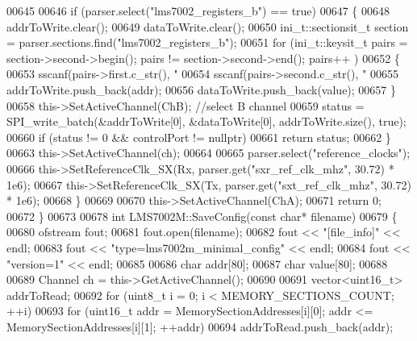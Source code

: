 \begin{DoxyCode}
{{{{{{{{{{{{{{{{{{{00645 
00646         \textcolor{keywordflow}{if} (parser.select(\textcolor{stringliteral}{"lms7002\_registers\_b"}) == \textcolor{keyword}{true})
00647         \{
00648             addrToWrite.clear();
00649             dataToWrite.clear();
00650             ini\_t::sectionsit\_t section = parser.sections.find(\textcolor{stringliteral}{"lms7002\_registers\_b"});
00651             \textcolor{keywordflow}{for} (ini\_t::keysit\_t pairs = section->second->begin(); pairs != section->second->end(); pairs++
      )
00652             \{
00653                 sscanf(pairs->first.c\_str(), \textcolor{stringliteral}{"%
00654                 sscanf(pairs->second.c\_str(), \textcolor{stringliteral}{"%
00655                 addrToWrite.push\_back(addr);
00656                 dataToWrite.push\_back(value);
00657             \}
00658             this->SetActiveChannel(ChB); \textcolor{comment}{//select B channel}
00659             status = SPI_write_batch(&addrToWrite[0], &dataToWrite[0], addrToWrite.size(), \textcolor{keyword}{true});
00660             \textcolor{keywordflow}{if} (status != 0 && controlPort != \textcolor{keyword}{nullptr})
00661                 \textcolor{keywordflow}{return} status;
00662         \}
00663         this->SetActiveChannel(ch);
00664 
00665         parser.select(\textcolor{stringliteral}{"reference\_clocks"});
00666         this->SetReferenceClk_SX(Rx, parser.get(\textcolor{stringliteral}{"sxr\_ref\_clk\_mhz"}, 30.72) * 1e6);
00667         this->SetReferenceClk_SX(Tx, parser.get(\textcolor{stringliteral}{"sxt\_ref\_clk\_mhz"}, 30.72) * 1e6);
00668     \}
00669 
00670     this->SetActiveChannel(ChA);
00671     \textcolor{keywordflow}{return} 0;
00672 \}
00673 
00678 \textcolor{keywordtype}{int} LMS7002M::SaveConfig(\textcolor{keyword}{const} \textcolor{keywordtype}{char}* filename)
00679 \{
00680     ofstream fout;
00681     fout.open(filename);
00682     fout << \textcolor{stringliteral}{"[file\_info]"} << endl;
00683     fout << \textcolor{stringliteral}{"type=lms7002m\_minimal\_config"} << endl;
00684     fout << \textcolor{stringliteral}{"version=1"} << endl;
00685 
00686     \textcolor{keywordtype}{char} addr[80];
00687     \textcolor{keywordtype}{char} value[80];
00688 
00689     Channel ch = this->GetActiveChannel();
00690 
00691     vector<uint16\_t> addrToRead;
00692     \textcolor{keywordflow}{for} (uint8\_t i = 0; i < MEMORY_SECTIONS_COUNT; ++i)
00693         \textcolor{keywordflow}{for} (uint16\_t addr = MemorySectionAddresses[i][0]; addr <= 
      MemorySectionAddresses[i][1]; ++addr)
00694             addrToRead.push\_back(addr);
}}}}}}}}}}}}}}}}}}}}}
\end{DoxyCode}
